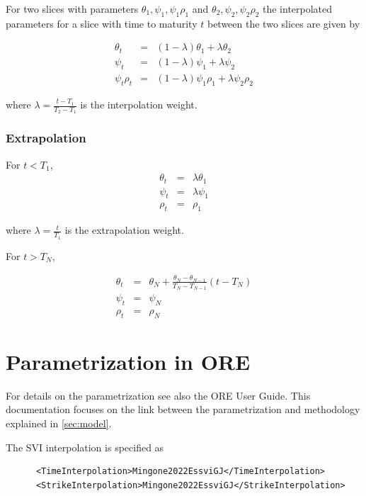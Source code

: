 \documentclass{amsart}
\theoremstyle{plain}
\numberwithin{equation}{section}
\begin{document}
For two slices with parameters $\theta_1, \psi_1, \psi_1 \rho_1$ and $\theta_2, \psi_2, \psi_2 \rho_2$ the interpolated parameters for a slice with time to maturity $t$ between the two slices are given by

\begin{eqnarray}
\theta_t &=& (1 - \lambda) \theta_1 + \lambda \theta_2 \\
\psi_t &=& (1 - \lambda) \psi_1 + \lambda \psi_2 \\
\psi_t \rho_t &=& (1 - \lambda) \psi_1 \rho_1 + \lambda \psi_2 \rho_2
\end{eqnarray}

where $\lambda = \frac{t - T_1}{T_2 - T_1}$ is the interpolation weight.

\subsubsection{Extrapolation}

For $t < T_1$,
\begin{eqnarray}
\theta_t &=& \lambda \theta_1 \\
\psi_t &=& \lambda \psi_1 \\
\rho_t &=& \rho_1
\end{eqnarray}

where $\lambda = \frac{t}{T_1}$ is the extrapolation weight.

For $t > T_N$,

\begin{eqnarray}
\theta_t &=& \theta_N  + \frac{\theta_N - \theta_{N-1}}{T_N - T_{N-1}} (t - T_N) \\
\psi_t &=& \psi_N \\
\rho_t &=& \rho_N
\end{eqnarray}

\section{Parametrization in ORE}

For details on the parametrization see also the ORE User Guide. This documentation focuses on the link between the
parametrization and methodology explained in \ref{sec:model}.

The SVI interpolation is specified as

\begin{verbatim}
      <TimeInterpolation>Mingone2022EssviGJ</TimeInterpolation>
      <StrikeInterpolation>Mingone2022EssviGJ</StrikeInterpolation>
\end{verbatim}
\end{document}
